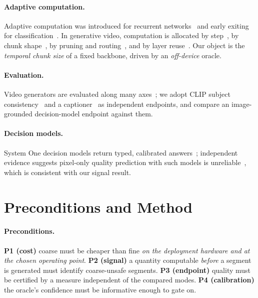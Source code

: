 \documentclass[journal]{IEEEtran}
\begin{document}
\paragraph{Adaptive computation.}
Adaptive computation was introduced for recurrent networks~\cite{graves2016adaptive} and early exiting for
classification~\cite{teerapittayanon2017branchynet,sun2021early}. In generative video, computation is
allocated by step~\cite{le2026dsa}, by chunk shape~\cite{ma2026flexforcing}, by
pruning and routing~\cite{wang2026pare}, and by layer reuse~\cite{adnan2025foresight}. Our object is the
\emph{temporal chunk size} of a fixed backbone, driven by an \emph{off-device} oracle.

\paragraph{Evaluation.}
Video generators are evaluated along many axes~\cite{huang2024vbench,zheng2025vbench20}; we adopt CLIP
subject consistency~\cite{radford2021clip} and a captioner~\cite{li2022blip} as independent endpoints, and
compare an image-grounded decision-model endpoint against them.

\paragraph{Decision models.}
System One decision models return typed, calibrated answers~\cite{ling2026jev}; independent evidence
suggests pixel-only quality prediction with such models is unreliable~\cite{robitza2026jevqa}, which is
consistent with our signal result.

\section{Preconditions and Method}
\label{sec:method}

\paragraph{Preconditions.}
\textbf{P1 (cost)} coarse must be cheaper than fine \emph{on the deployment hardware and at the chosen
operating point}. \textbf{P2 (signal)} a quantity computable \emph{before} a segment is generated must
identify coarse-unsafe segments. \textbf{P3 (endpoint)} quality must be certified by a measure
independent of the compared modes. \textbf{P4 (calibration)} the oracle's confidence must be informative
enough to gate on.
\end{document}
